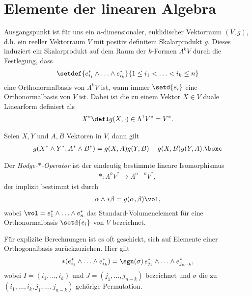 \documentclass[%
	paper=a5,%
	fleqn,%
	DIV=18,%
	BCOR=0mm,
	fontsize=11pt,
	titlepage=false,%
	bibliography=totoc,
	DIV=18,%
	twoside=true,
	pdftitle=Riemannsche Geometrie,
	pdfauthor=Uwe Semmelmann,
	numbers=noendperiod]%
	{scrbook}
\begin{document}
\section{Elemente der linearen Algebra}

Ausgangspunkt ist für uns ein $n$-dimensionaler, euklidischer Vektorraum $(V,g)$, d.h. ein reeller Vektorraum $V$ mit positiv definitem Skalarprodukt $g$. Dieses induziert ein Skalarprodukt auf dem Raum der $k$-Formen $\Lambda^kV$ durch die Festlegung, dass
\begin{align*}
\setdef{e_{i_{1}}^*\wedge \ldots \wedge e_{i_{k}}^*}{1\le i_{1}< \ldots < i_{k} \le n}
\end{align*}
eine Orthonormalbasis von $\Lambda^k V$ ist, wann immer $\setd{e_{i}}$ eine Orthonormalbasis von $V$ ist. Dabei ist die zu einem Vektor $X\in V$ duale Linearform definiert als
\begin{align*}
X^* \defl g(X,\cdot) \in\Lambda^1 V^* = V^*.
\end{align*}

\begin{ex}
Seien $X,Y$ und $A,B$ Vektoren in $V$, dann gilt
\begin{align*}
g(X^*\wedge Y^*, A^*\wedge B^*) = g(X,A)g(Y,B) - g(X,B)g(Y,A).\boxc
\end{align*}
\end{ex}

\begin{defn}
Der \emph{Hodge-$*$-Operator} ist der eindeutig bestimmte lineare Isomorphismus
\begin{align*}
* : \Lambda^k V^*\to \Lambda^{n-k}V^*,
\end{align*}
der implizit bestimmt ist durch
\begin{align*}
\alpha\wedge * \beta = g(\alpha,\beta)\vol,
\end{align*}
wobei $\vol = e_{1}^*\wedge \ldots \wedge e_{n}^*$ das Standard-Volumenelement für eine Orthonormalbasis $\setd{e_{i}}$ von $V$ bezeichnet.\fish
\end{defn}

\begin{rem}
Für explizite Berechnungen ist es oft geschickt, sich auf Elemente einer Orthogonalbasis zurückzuziehen. Hier gilt
\begin{align*}
*(e_{i_{1}}^*\wedge \ldots \wedge e_{i_{k}}^*) = \sgn(\sigma)\, e_{j_{1}}^*\wedge \ldots \wedge e_{j_{n-k}}^*,
\end{align*}
wobei $I=(i_{1},\ldots,i_{k})$ und $J=(j_{1},\ldots,j_{n-k})$ bezeichnet und $\sigma$ die zu $(i_{1},\ldots,i_{k},j_{1},\ldots,j_{n-k})$ gehörige Permutation.\map
\end{rem}
\end{document}
